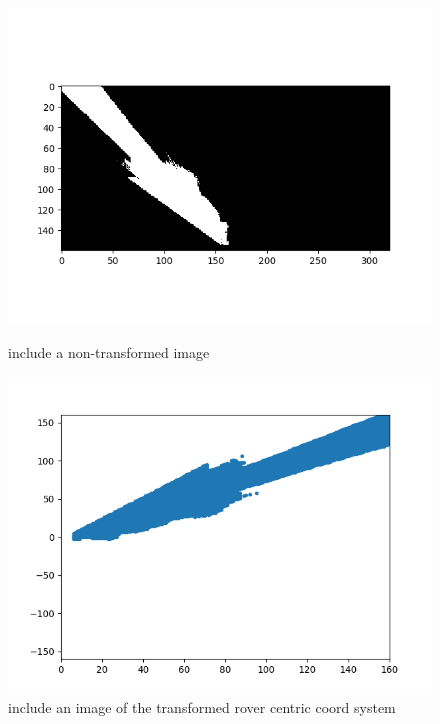 \documentclass[a4paper]{article}
\begin{document}
\vspace{2cm}

\begin{figure}[h]
\centering
\begin{minipage}[t]{0.45\linewidth}
\centering
\includegraphics[scale=0.45]{image19}
\caption{include a non-transformed image}
\end{minipage}
\hspace{0.5cm}
\begin{minipage}[t]{0.45\linewidth}
\centering
\includegraphics[scale=0.45]{image20}
\caption{include an image of the transformed rover centric coord system}
\end{minipage}
\end{figure}
\end{document}
